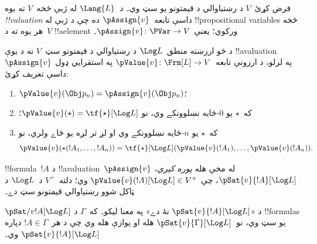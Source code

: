 \documentclass[../../../include/open-logic-section]{subfiles}
\begin{document}


\begin{defn}[!!^{valuation}s]
فرض کړئ~$V$ د رښتياوالي د قيمتونو يو سټ وي۔ د~$\Lang{L}$
له ژبې څخه~$V$ ته يوه \emph{!!{valuation}} داسې
تابعه~$\pAssign{v}$ ده چې د ژبې له !!{propositional variable}s
څخه هر يوه ته د~$V$ !!a{element} ورکوي؛ يعنې
$\pAssign{v} \colon \PVar \to V$۔
\end{defn}

\begin{defn}
  د څو ارزښته منطق~$\Log L$ د رښتياوالي د قيمتونو
  سټ~$V$ ته د يوې !!a{valuation}~$\pAssign{v}$ په لرلو،
  د ارزونې تابعه~$\pValue{v} \colon \Frm[L] \to V$
  په استقرايي ډول داسې تعريف کړئ:
  \begin{enumerate}
    \item $\pValue{v}(\Obj p_n) = \pAssign{v}(\Obj p_n)$؛
    \item که~$\star$ يو $0$-ځايه نښلوونکے وي، نو
    $\pValue{v}(\star)  = \tf{\star}[\Log L]$؛
    \item که~$\star$ يو $n$-ځايه نښلوونکے وي او لږ تر لږه يو ځاے ولري، نو
    \[
      \pValue{v}(\star(!A_1, \dots, !A_n)) = \tf{\star}[\Log L]
      (\pValue{v}(!A_1), \dots, \pValue{v}(!A_n)).
    \]
  \end{enumerate}
\end{defn}

\begin{defn}[صدق]
 !!{formula}~$!A$ د
  !!a{valuation}~$\pAssign{v}$ له مخې هله \emph{پوره کېږي}،
  $\pSat{v}{!A}[\Log L]$، چې
  $\pValue{v}(!A)[\Log L] \in V^+$ وي؛ دلته~$V^+$
  د~$\Log L$ د ټاکل شوو رښتياوالي قيمتونو سټ دے۔

  $\pSat/{v}{!A}[\Log L]$ د «$\pSat{v}{!A}[\Log
  L]$ نۀ دے» په معنا ليکو۔ که~$\Gamma$ د !!{formula}s
  يو سټ وي، نو~$\pSat{v}{\Gamma}[\Log L]$ هله او يوازې
  هله وي چې د هر~$!A \in \Gamma$ دپاره
  $\pSat{v}{!A}[\Log L]$ وي۔
\end{defn}
\end{document}

